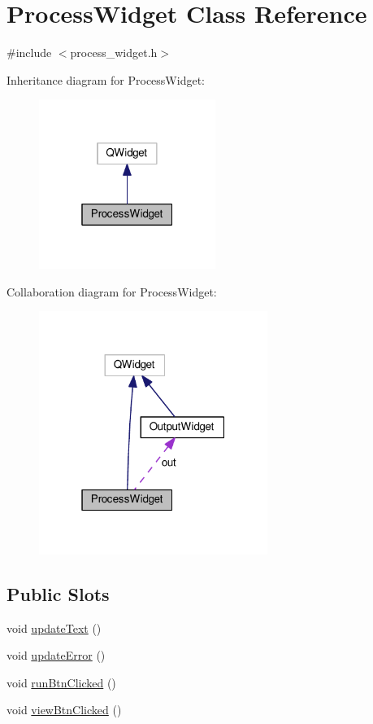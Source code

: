\hypertarget{classProcessWidget}{}\section{Process\+Widget Class Reference}
\label{classProcessWidget}


{\ttfamily \#include $<$process\+\_\+widget.\+h$>$}



Inheritance diagram for Process\+Widget\+:
\nopagebreak
\begin{figure}[H]
\begin{center}
\leavevmode
\includegraphics[width=163pt]{classProcessWidget__inherit__graph}
\end{center}
\end{figure}


Collaboration diagram for Process\+Widget\+:
\nopagebreak
\begin{figure}[H]
\begin{center}
\leavevmode
\includegraphics[width=211pt]{classProcessWidget__coll__graph}
\end{center}
\end{figure}
\subsection*{Public Slots}
\begin{DoxyCompactItemize}
\item 
void \hyperlink{classProcessWidget_a56fb109b399232b285cbea288631d18b}{update\+Text} ()
\item 
void \hyperlink{classProcessWidget_aa998c907c732bf27822ae53a8e83850c}{update\+Error} ()
\item 
void \hyperlink{classProcessWidget_afc941023cc434c5de6cc07059245d393}{run\+Btn\+Clicked} ()
\item 
void \hyperlink{classProcessWidget_af03bf5d00a16b15dfeb27d9865dc0b72}{view\+Btn\+Clicked} ()
\end{DoxyCompactItemize}
